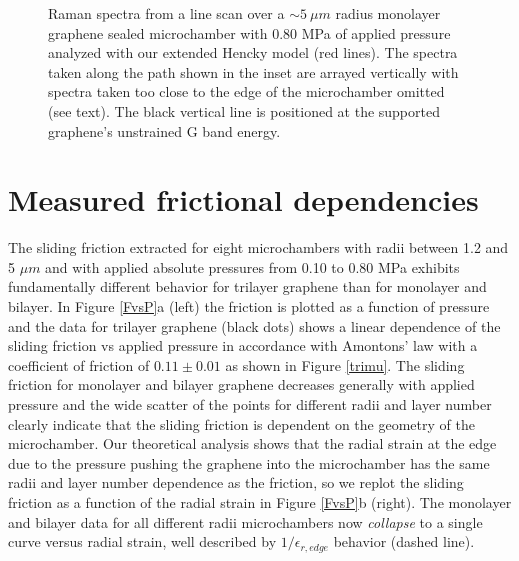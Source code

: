 \begin{figure}
\begin{center}
\end{center}
\caption{\label{fitlinescan} Raman spectra from a line scan over a $\sim 5 \ \mu m$ radius monolayer graphene sealed microchamber with 0.80 MPa of applied pressure analyzed with our extended Hencky model (red lines).  The spectra taken along the path shown in the inset are arrayed vertically with spectra taken too close to the edge of the microchamber omitted (see text).  The black vertical line is positioned at the supported graphene's unstrained G band energy.}
\end{figure}

\section{Measured frictional dependencies}
The sliding friction extracted for eight microchambers with radii between 1.2 and 5 $\mu m$ and with applied absolute pressures from 0.10 to 0.80 MPa exhibits fundamentally different behavior for trilayer graphene than for monolayer and bilayer.  In Figure \ref{FvsP}a (left) the friction is plotted as a function of pressure and the data for trilayer graphene (black dots) shows a linear dependence of the sliding friction vs applied pressure in accordance with Amontons' law with a coefficient of friction of $0.11 \pm 0.01$ as shown in Figure \ref{trimu}.  The sliding friction for monolayer and bilayer graphene decreases generally with applied pressure and the wide scatter of the points for different radii and layer number clearly indicate that the sliding friction is dependent on the geometry of the microchamber. Our theoretical analysis shows that the radial strain at the edge due to the pressure pushing the graphene into the microchamber has the same radii and layer number dependence as the friction, so we replot the sliding friction as a function of the radial strain in Figure \ref{FvsP}b (right). The monolayer and bilayer data for all different radii microchambers now \emph{collapse} to a single curve versus radial strain, well described by $1/\epsilon_{r,edge}$ behavior (dashed line). 

